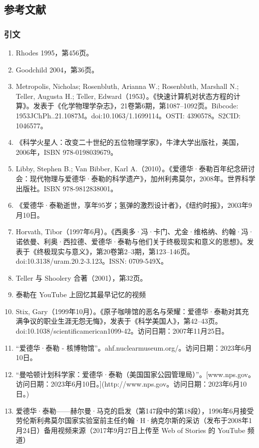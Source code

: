 \subsection{参考文献}
\subsubsection{引文}
\begin{enumerate}
\item Rhodes 1995，第456页。
\item Goodchild 2004，第36页。
\item Metropolis, Nicholas; Rosenbluth, Arianna W.; Rosenbluth, Marshall N.; Teller, Augusta H.; Teller, Edward（1953）。《快速计算机对状态方程的计算》。发表于《化学物理学杂志》，21卷第6期，第1087–1092页。Bibcode: 1953JChPh..21.1087M。doi:10.1063/1.1699114。OSTI: 4390578。S2CID: 1046577。
\item 《科学火星人：改变二十世纪的五位物理学家》，牛津大学出版社，美国，2006年，ISBN 978-0198039679。
\item Libby, Stephen B.; Van Bibber, Karl A.（2010）。《爱德华·泰勒百年纪念研讨会：现代物理与爱德华·泰勒的科学遗产》，加州利弗莫尔，2008年。世界科学出版社。ISBN 978-9812838001。
\item 《爱德华·泰勒逝世，享年95岁；氢弹的激烈设计者》，《纽约时报》，2003年9月10日。
\item Horvath, Tibor（1997年6月）。《西奥多·冯·卡门、尤金·维格纳、约翰·冯·诺依曼、利奥·西拉德、爱德华·泰勒与他们关于终极现实和意义的思想》。发表于《终极现实与意义》，第20卷第2–3期，第123–146页。doi:10.3138/uram.20.2-3.123。ISSN: 0709-549X。
\item Teller 与 Shoolery 合著（2001），第32页。
\item 泰勒在 YouTube 上回忆其最早记忆的视频
\item Stix, Gary（1999年10月）。《原子咖啡馆的恶名与荣耀：爱德华·泰勒对其充满争议的职业生涯无怨无悔》，发表于《科学美国人》，第42–43页。doi:10.1038/scientificamerican1099-42。访问日期：2007年11月25日。
\item “爱德华·泰勒 - 核博物馆”。ahf.nuclearmuseum.org/。访问日期：2023年6月10日。
\item “曼哈顿计划科学家：爱德华·泰勒（美国国家公园管理局）”。[www.nps.gov。访问日期：2023年6月10日。](http://www.nps.gov。访问日期：2023年6月10日。)
\item 爱德华·泰勒——赫尔曼·马克的启发（第147段中的第18段），1996年6月接受劳伦斯利弗莫尔国家实验室前主任约翰·H·纳克尔斯的采访（发布于2008年1月24日）备用视频来源（2017年9月27日上传至 Web of Stories 的 YouTube 频道）

\end{enumerate}
